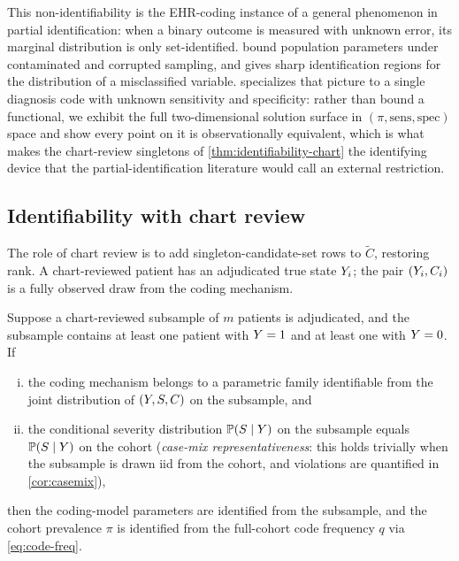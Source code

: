 This non-identifiability is the EHR-coding instance of a general
phenomenon in partial identification: when a binary outcome is
measured with unknown error, its marginal distribution is only
set-identified. \citet{horowitz1995identification} bound population
parameters under contaminated and corrupted sampling, and
\citet{molinari2008partial} gives sharp identification regions for the
distribution of a misclassified variable. 
specializes that picture to a single diagnosis code with unknown
sensitivity and specificity: rather than bound a functional, we exhibit
the full two-dimensional solution surface in
$(\pi,\mathrm{sens},\mathrm{spec})$ space and show every point on it is
observationally equivalent, which is what makes the chart-review
singletons of \cref{thm:identifiability-chart} the identifying device
that the partial-identification literature would call an external
restriction.

\subsection{Identifiability with chart review}

The role of chart review is to add singleton-candidate-set rows to
$\tilde{C}$, restoring rank. A chart-reviewed patient has an
adjudicated true state $Y_i$; the pair $(Y_i, C_i)$ is a fully
observed draw from the coding mechanism.

\begin{theorem}
\label{thm:identifiability-chart}
Suppose a chart-reviewed subsample of $m$ patients is adjudicated, and
the subsample contains at least one patient with $Y = 1$ and at least
one with $Y = 0$. If
\begin{enumerate}[(i)]
\item the coding mechanism belongs to a parametric family identifiable
  from the joint distribution of $(Y, S, C)$ on the subsample, and
\item the conditional severity distribution $\mathbb{P}(S \mid Y)$ on the
  subsample equals $\mathbb{P}(S \mid Y)$ on the cohort
  (\emph{case-mix representativeness}: this holds trivially when the
  subsample is drawn iid from the cohort, and violations are
  quantified in \cref{cor:casemix}),
\end{enumerate}
then the coding-model parameters are identified from the subsample, and
the cohort prevalence $\pi$ is identified from the full-cohort code
frequency $q$ via \eqref{eq:code-freq}.
\end{theorem}


